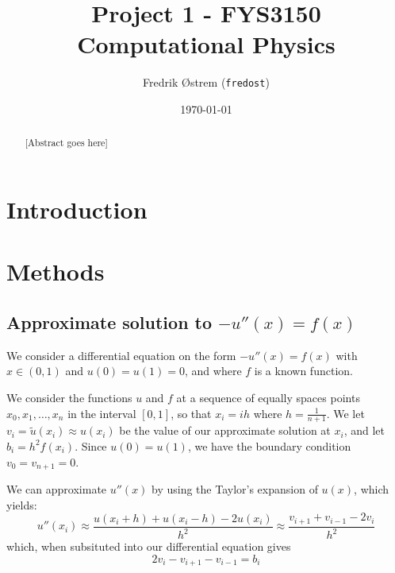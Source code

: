 \documentclass[12pt,a4paper]{article}
\begin{document}
\title{Project 1 - FYS3150 Computational Physics}
\author{Fredrik Østrem (\texttt{fredost})}
\date{\today}

\maketitle

\begin{abstract}
  [Abstract goes here]
\end{abstract}

\tableofcontents

\clearpage

\section{Introduction}

\section{Methods}

\subsection{Approximate solution to $-u''(x) = f(x)$}

We consider a differential equation on the form $-u''(x) = f(x)$ with $x \in (0,1)$ and $u(0) = u(1) = 0$, and where $f$ is a known function.

We consider the functions $u$ and $f$ at a sequence of equally spaces points $x_0,x_1,\ldots,x_n$ in the interval $[0,1]$, so that $x_i = ih$ where $h = \frac{1}{n+1}$. We let $v_i = \tilde{u}(x_i) \approx u(x_i)$ be the value of our approximate solution at $x_i$, and let $b_i = h^2 f(x_i)$. Since $u(0) = u(1)$, we have the boundary condition $v_0 = v_{n+1} = 0$.

We can approximate $u''(x)$ by using the Taylor's expansion of $u(x)$, which yields:
\begin{equation}
  u''(x_i) \approx \frac{u(x_i+h) + u(x_i-h) - 2 u(x_i)}{h^2} \approx \frac{v_{i+1} + v_{i-1} - 2 v_i}{h^2}
\end{equation}
which, when subsituted into our differential equation gives
\begin{equation}
  2v_i - v_{i+1} - v_{i-1} = b_i
\end{equation}
\end{document}
